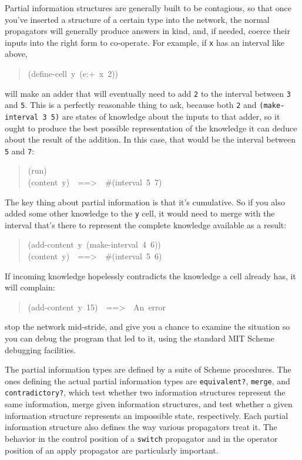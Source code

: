 \documentclass[12pt,letterpaper,english]{article}
\begin{document}
Partial information structures are generally built to be contagious,
so that once you've inserted a structure of a certain type into
the network, the normal propagators will generally produce answers
in kind, and, if needed, coerce their inputs into the right form
to co-operate.  For example, if \texttt{x} has an interval like above,
\begin{quote}{\ttfamily \raggedright \noindent
(define-cell~y~(e:+~x~2))
}\end{quote}
will make an adder that will eventually need to add \texttt{2} to the
interval between \texttt{3} and \texttt{5}.  This is a perfectly reasonable
thing to ask, because both \texttt{2} and \texttt{(make-interval 3 5)} are
states of knowledge about the inputs to that adder, so it ought to
produce the best possible representation of the knowledge it can
deduce about the result of the addition.  In this case, that would be
the interval between \texttt{5} and \texttt{7}:
\begin{quote}{\ttfamily \raggedright \noindent
(run)~\\
(content~y)~~==>~~{\#}(interval~5~7)
}\end{quote}

The key thing about partial information is that it's
cumulative.  So if you also added some other knowledge to the \texttt{y}
cell, it would need to merge with the interval that's there to
represent the complete knowledge available as a result:
\begin{quote}{\ttfamily \raggedright \noindent
(add-content~y~(make-interval~4~6))~\\
(content~y)~~==>~~{\#}(interval~5~6)
}\end{quote}

If incoming knowledge hopelessly contradicts the knowledge a cell
already has, it will complain:
\begin{quote}{\ttfamily \raggedright \noindent
(add-content~y~15)~~==>~~An~error
}\end{quote}
stop the network mid-stride, and give you a chance to examine the
situation so you can debug the program that led to it, using the
standard MIT Scheme debugging facilities.

The partial information types are defined by a suite of Scheme
procedures.  The ones defining the actual partial information types
are \texttt{equivalent?}, \texttt{merge}, and \texttt{contradictory?}, which test
whether two information structures represent the same information,
merge given information structures, and test whether a given
information structure represents an impossible state, respectively.
Each partial information structure also defines the way various
propagators treat it.  The behavior in the control position of a
\texttt{switch} propagator and in the operator position of an apply
propagator are particularly important.
\end{document}
